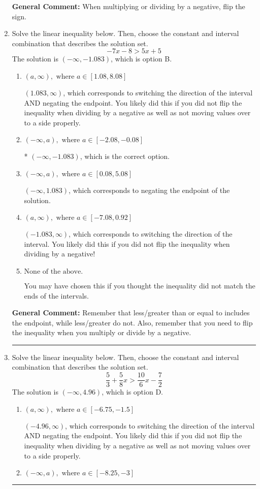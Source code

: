 \documentclass{extbook}[14pt]
\newcommand{\litem}[1]{\item #1

\rule{\textwidth}{0.4pt}}
\begin{document}
\begin{enumerate}
{\textbf{General Comment:} When multiplying or dividing by a negative, flip the sign.
}
\litem{
Solve the linear inequality below. Then, choose the constant and interval combination that describes the solution set.
\[ -7x -8 > 5x + 5 \]The solution is \( (-\infty, -1.083) \), which is option B.\begin{enumerate}[label=\Alph*.]
\item \( (a, \infty), \text{ where } a \in [1.08, 8.08] \)

 $(1.083, \infty)$, which corresponds to switching the direction of the interval AND negating the endpoint. You likely did this if you did not flip the inequality when dividing by a negative as well as not moving values over to a side properly.
\item \( (-\infty, a), \text{ where } a \in [-2.08, -0.08] \)

* $(-\infty, -1.083)$, which is the correct option.
\item \( (-\infty, a), \text{ where } a \in [0.08, 5.08] \)

 $(-\infty, 1.083)$, which corresponds to negating the endpoint of the solution.
\item \( (a, \infty), \text{ where } a \in [-7.08, 0.92] \)

 $(-1.083, \infty)$, which corresponds to switching the direction of the interval. You likely did this if you did not flip the inequality when dividing by a negative!
\item \( \text{None of the above}. \)

You may have chosen this if you thought the inequality did not match the ends of the intervals.
\end{enumerate}

\textbf{General Comment:} Remember that less/greater than or equal to includes the endpoint, while less/greater do not. Also, remember that you need to flip the inequality when you multiply or divide by a negative.
}
\litem{
Solve the linear inequality below. Then, choose the constant and interval combination that describes the solution set.
\[ \frac{5}{3} + \frac{5}{8} x > \frac{10}{6} x - \frac{7}{2} \]The solution is \( (-\infty, 4.96) \), which is option D.\begin{enumerate}[label=\Alph*.]
\item \( (a, \infty), \text{ where } a \in [-6.75, -1.5] \)

 $(-4.96, \infty)$, which corresponds to switching the direction of the interval AND negating the endpoint. You likely did this if you did not flip the inequality when dividing by a negative as well as not moving values over to a side properly.
\item \( (-\infty, a), \text{ where } a \in [-8.25, -3] \)


\end{enumerate}}
\end{enumerate}
\end{document}
